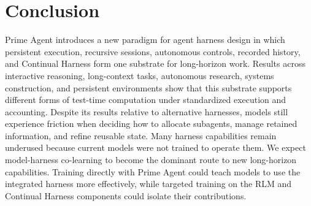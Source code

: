 \section{Conclusion}
Prime Agent introduces a new paradigm for agent harness design in which persistent execution, recursive sessions, autonomous controls, recorded history, and Continual Harness form one substrate for long-horizon work. Results across interactive reasoning, long-context tasks, autonomous research, systems construction, and persistent environments show that this substrate supports different forms of test-time computation under standardized execution and accounting. Despite its results relative to alternative harnesses, models still experience friction when deciding how to allocate subagents, manage retained information, and refine reusable state. Many harness capabilities remain underused because current models were not trained to operate them. We expect model-harness co-learning to become the dominant route to new long-horizon capabilities. Training directly with Prime Agent could teach models to use the integrated harness more effectively, while targeted training on the RLM and Continual Harness components could isolate their contributions.
